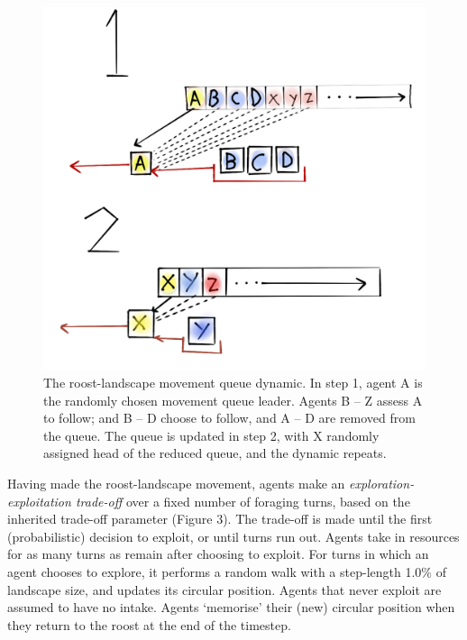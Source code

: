 \begin{figure}
\centering
\includegraphics{fig_moveq.png}
\caption{The roost-landscape movement queue dynamic. In step 1, agent A
is the randomly chosen movement queue leader. Agents B -- Z assess A to
follow; and B -- D choose to follow, and A -- D are removed from the
queue. The queue is updated in step 2, with X randomly assigned head of
the reduced queue, and the dynamic repeats.}
\end{figure}

Having made the roost-landscape movement, agents make an
\emph{exploration-exploitation trade-off} over a fixed number of
foraging turns, based on the inherited trade-off parameter (Figure 3).
The trade-off is made until the first (probabilistic) decision to
exploit, or until turns run out. Agents take in resources for as many
turns as remain after choosing to exploit. For turns in which an agent
chooses to explore, it performs a random walk with a step-length 1.0\%
of landscape size, and updates its circular position. Agents that never
exploit are assumed to have no intake. Agents `memorise' their (new)
circular position when they return to the roost at the end of the
timestep.

